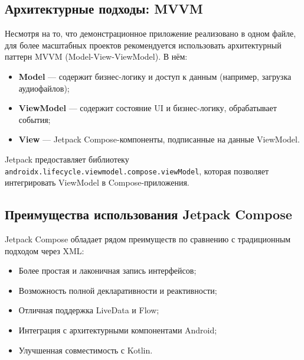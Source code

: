 \subsection{Архитектурные подходы: MVVM}

Несмотря на то, что демонстрационное приложение реализовано в одном файле, для более масштабных проектов рекомендуется использовать архитектурный паттерн MVVM (Model-View-ViewModel). В нём:

\begin{itemize}
  \item \textbf{Model} — содержит бизнес-логику и доступ к данным (например, загрузка аудиофайлов);
  \item \textbf{ViewModel} — содержит состояние UI и бизнес-логику, обрабатывает события;
  \item \textbf{View} — Jetpack Compose-компоненты, подписанные на данные ViewModel.
\end{itemize}

Jetpack предоставляет библиотеку \texttt{androidx.lifecycle.viewmodel.compose.viewModel}, которая позволяет интегрировать ViewModel в Compose-приложения.

\subsection{Преимущества использования Jetpack Compose}

Jetpack Compose обладает рядом преимуществ по сравнению с традиционным подходом через XML:

\begin{itemize}
  \item Более простая и лаконичная запись интерфейсов;
  \item Возможность полной декларативности и реактивности;
  \item Отличная поддержка LiveData и Flow;
  \item Интеграция с архитектурными компонентами Android;
  \item Улучшенная совместимость с Kotlin.
\end{itemize}
